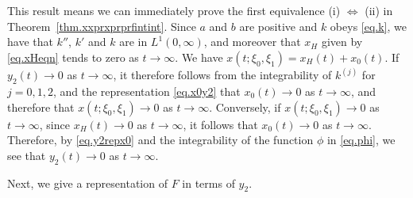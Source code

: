 \documentclass[10pt,reqno]{amsart}
\theoremstyle{definition}
\begin{document}
	This result means we can immediately prove the first equivalence (i) $\Longleftrightarrow$ (ii) in Theorem~\ref{thm.xxprxprprfintint}. 
	Since $a$ and $b$ are positive and $k$ obeys \eqref{eq.k}, we have that $k''$, $k'$ and $k$ are in $L^1(0,\infty)$, and moreover that $x_H$ given by \eqref{eq.xHeqn} tends to zero as $t\to\infty$. We have $x(t;\xi_0,\xi_1)=x_H(t)+x_0(t)$. If $y_2(t)\to 0$ as $t\to\infty$, it therefore follows from the integrability of $k^{(j)}$ for $j=0,1,2$, and the representation \eqref{eq.x0y2} that $x_0(t)\to 0$ as $t\to\infty$, and therefore that $x(t;\xi_0,\xi_1)\to 0$ as $t\to\infty$. Conversely, if $x(t;\xi_0,\xi_1)\to 0$ as $t\to\infty$, since $x_H(t)\to 0$ as $t\to\infty$, it follows that $x_0(t)\to 0$ as $t\to\infty$. Therefore, by \eqref{eq.y2repx0} and the integrability of the function $\phi$ in \eqref{eq.phi}, we see that $y_2(t)\to 0$ as $t\to\infty$.
	
	Next, we give a representation of $F$ in terms of $y_2$. 	
	
\end{document}
